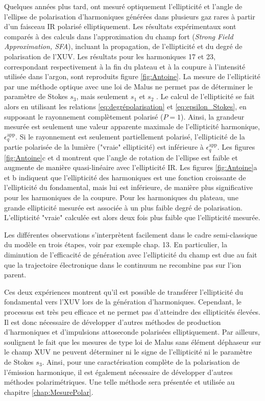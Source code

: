 Quelques années plus tard,  ont mesuré optiquement l'ellipticité et l'angle de l'ellipse de polarisation d'harmoniques générées dans plusieurs gaz rares à partir d'un faisceau IR polarisé elliptiquement. Les résultats expérimentaux sont comparés à des calculs dans l'approximation du champ fort (\textit{Strong Field Approximation, SFA}), incluant la propagation, de l'ellipticité et du degré de polarisation de l'XUV. Les résultats pour les harmoniques 17 et 23, correspondant respectivement à la fin du plateau et à la coupure à l'intensité utilisée dans l'argon, sont reproduits figure \ref{fig:Antoine}. La mesure de l'ellipticité par une méthode optique avec une loi de Malus ne permet pas de déterminer le paramètre de Stokes $s_3$, mais seulement $s_1$ et $s_2$ . Le calcul de l'ellipticité se fait alors en utilisant les relations \ref{eq:degrépolarisation} et \ref{eq:epsilon_Stokes}, en supposant le rayonnement complètement polarisé ($P = 1$). Ainsi, la grandeur mesurée est seulement une valeur apparente maximale de l'ellipticité harmonique, $\epsilon_q^{\text{app}}$. Si le rayonnement est seulement partiellement polarisé, l'ellipticité de la partie polarisée de la lumière ("vraie" ellipticité) est inférieure à $\epsilon_q^{\text{app}}$. Les figures \ref{fig:Antoine}c et d montrent que l'angle de rotation de l'ellipse est faible et augmente de manière quasi-linéaire avec l'ellipticité IR. Les figures \ref{fig:Antoine}a et b indiquent que l'ellipticité des harmoniques est une fonction croissante de l'ellipticité du fondamental, mais lui est inférieure, de manière plus significative pour les harmoniques de la coupure. Pour les harmoniques du plateau, une grande ellipticité mesurée est associée à un plus faible degré de polarisation. L'ellipticité "vraie" calculée est alors deux fois plus faible que l'ellipticité mesurée.

Les différentes observations s'interprètent facilement dans le cadre semi-classique du modèle en trois étapes, voir par exemple  chap. 13. En particulier, la diminution de l'efficacité de génération avec l'ellipticité du champ est due au fait que la trajectoire électronique dans le continuum ne recombine pas sur l'ion parent.

Ces deux expériences montrent qu'il est possible de transférer l'ellipticité du fondamental vers l'XUV lors de la génération d'harmoniques. Cependant, le processus est très peu efficace et ne permet pas d'atteindre des ellipticités élevées. Il est donc nécessaire de développer d'autres méthodes de production d'harmoniques et d'impulsions attoseconde polarisées elliptiquement. Par ailleurs,  soulignent le fait que les mesures de type loi de Malus sans élément déphaseur sur le champ XUV ne peuvent déterminer ni le signe de l'ellipticité ni le paramètre de Stokes $s_3$. Ainsi, pour une caractérisation complète de la polarisation de l'émission harmonique, il est également nécessaire de développer d'autres méthodes polarimétriques. Une telle méthode sera présentée et utilisée au chapitre \ref{chap:MesurePolar}.



